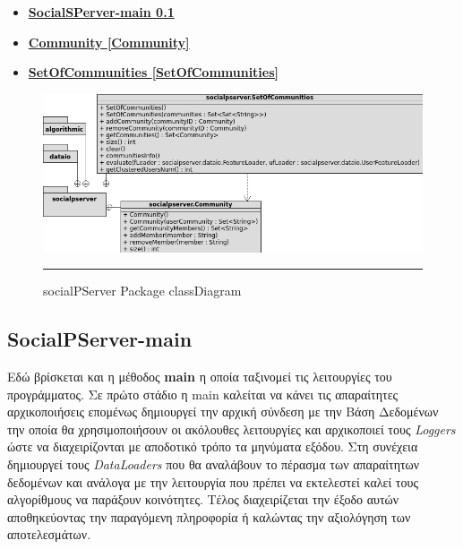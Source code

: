 \begin{itemize}
\renewcommand{\labelitemi}{$\star$}
\item \textbf{  \hyperref[main]{ SocialSPerver-main   \ref*{main} } } 
\item \textbf{  \hyperref[Community]{ Community   \ref*{Community} }  }  
\item \textbf{  \hyperref[SetOfCommunities]{ SetOfCommunities   \ref*{SetOfCommunities} }  } 
\end{itemize}


\begin{figure}[htbp]
  \hspace{-3.0em}    
    \includegraphics[scale=0.80]{Figures/socialpserverPackageClassDiagram.png}
	\rule{35em}{0.5pt}  %
	\caption[socialPServerClassDiagram]{socialPServer Package classDiagram}
  \label{fig:socialPServerClassDiagram}  
\end{figure}


\subsection{SocialPServer-main}
\label{main}
\noindent
Εδώ βρίσκεται και η μέθοδος \textbf{main} η οποία ταξινομεί τις λειτουργίες του προγράμματος. Σε πρώτο στάδιο η main καλείται να κάνει τις απαραίτητες αρχικοποιήσεις 
επομένως δημιουργεί την αρχική σύνδεση με την Βάση Δεδομένων την οποία θα χρησιμοποιήσουν οι ακόλουθες λειτουργίες και αρχικοποιεί τους \emph{Loggers} ώστε να διαχειρίζονται
με αποδοτικό τρόπο τα μηνύματα εξόδου. Στη συνέχεια δημιουργεί τους \emph{DataLoaders} που θα αναλάβουν το πέρασμα των απαραίτητων δεδομένων και ανάλογα με την λειτουργία
που πρέπει να εκτελεστεί καλεί τους αλγορίθμους να παράξουν κοινότητες. Τέλος διαχειρίζεται την έξοδο αυτών αποθηκεύοντας την παραγόμενη πληροφορία ή καλώντας 
την αξιολόγηση των αποτελεσμάτων.

